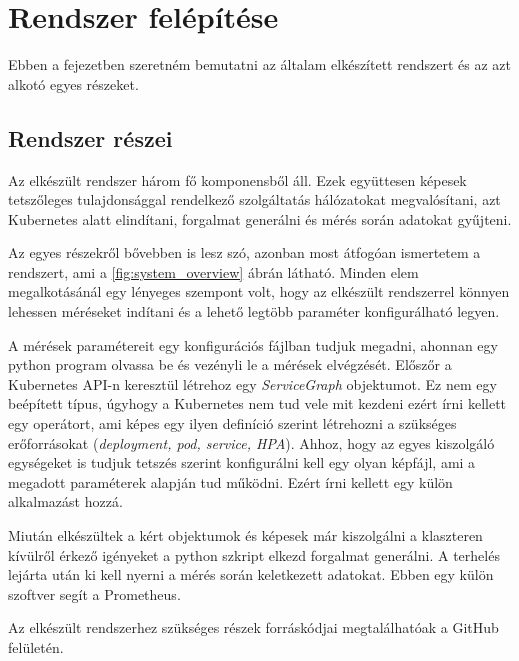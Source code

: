 \chapter{Rendszer felépítése}
\label{sec:system}
Ebben a fejezetben szeretném bemutatni az általam elkészített rendszert és az azt alkotó egyes részeket.


\section{Rendszer részei}
Az elkészült rendszer három fő komponensből áll. Ezek együttesen képesek tetszőleges tulajdonsággal rendelkező szolgáltatás hálózatokat megvalósítani, azt Kubernetes alatt elindítani, forgalmat generálni és mérés során adatokat gyűjteni. 

Az egyes részekről bővebben is lesz szó, azonban most átfogóan ismertetem a rendszert, ami a \ref{fig:system_overview} ábrán látható. Minden elem megalkotásánál egy lényeges szempont volt, hogy az elkészült rendszerrel könnyen lehessen méréseket indítani és a lehető legtöbb paraméter konfigurálható legyen.

A mérések paramétereit egy konfigurációs fájlban tudjuk megadni, ahonnan egy python program olvassa be és vezényli le a mérések elvégzését. Előszőr a Kubernetes API-n keresztül létrehoz egy \textit{ServiceGraph} objektumot. Ez nem egy beépített típus, úgyhogy a Kubernetes nem tud vele mit kezdeni ezért írni kellett egy operátort, ami képes egy ilyen definíció szerint létrehozni a szükséges erőforrásokat (\textit{deployment, pod, service, HPA}). Ahhoz, hogy az egyes kiszolgáló egységeket is tudjuk tetszés szerint konfigurálni kell egy olyan képfájl, ami a megadott paraméterek alapján tud működni. Ezért írni kellett egy külön alkalmazást hozzá.

Miután elkészültek a kért objektumok és képesek már kiszolgálni a klaszteren kívülről érkező igényeket a python szkript elkezd forgalmat generálni. A terhelés lejárta után ki kell nyerni a mérés során keletkezett adatokat. Ebben egy külön szoftver segít a Prometheus\citep{Prometheus}. 

Az elkészült rendszerhez szükséges részek forráskódjai megtalálhatóak a GitHub felületén\citep{gitRepo}. 

